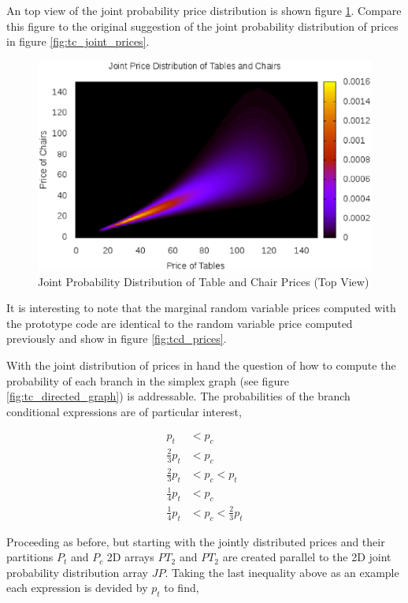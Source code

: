An top view of the joint probability price distribution is shown figure \ref{fig:Ptc_flat}. Compare this figure to the original suggestion of the joint probability distribution of prices in figure \ref{fig:tc_joint_prices}. 

\begin{figure}
  \centering
  \includegraphics[width=120mm]{Images/Ptc_flat.eps}
  \caption[Joint Probability Distribution of Table and Chair Prices (Top View)]
          {Joint Probability Distribution of Table and Chair Prices (Top View)}
  \label{fig:Ptc_flat}
\end{figure}

It is interesting to note that the marginal random variable prices computed with the prototype code are identical to the random variable price computed previously and show in figure \ref{fig:tcd_prices}.

With the joint distribution of prices in hand the question of how to compute the probability of each branch in the simplex graph (see figure \ref{fig:tc_directed_graph}) is addressable. The probabilities of the branch conditional expressions are of particular interest,

\begin{align*}
p_t &< p_c\\
\frac{2}{3}p_t &< p_c\\
\frac{2}{3}p_t &< p_c < p_t\\
\frac{1}{4}p_t &< p_c\\
\frac{1}{4}p_t &< p_c < \frac{2}{3}p_t
\end{align*}

Proceeding as before, but starting with the jointly distributed prices and their partitions $P_t$ and $P_c$ 2D arrays $PT_2$ and $PT_2$ are created parallel to the 2D joint probability distribution array $JP$. Taking the last inequality above as an example each expression is devided by $p_t$ to find,

